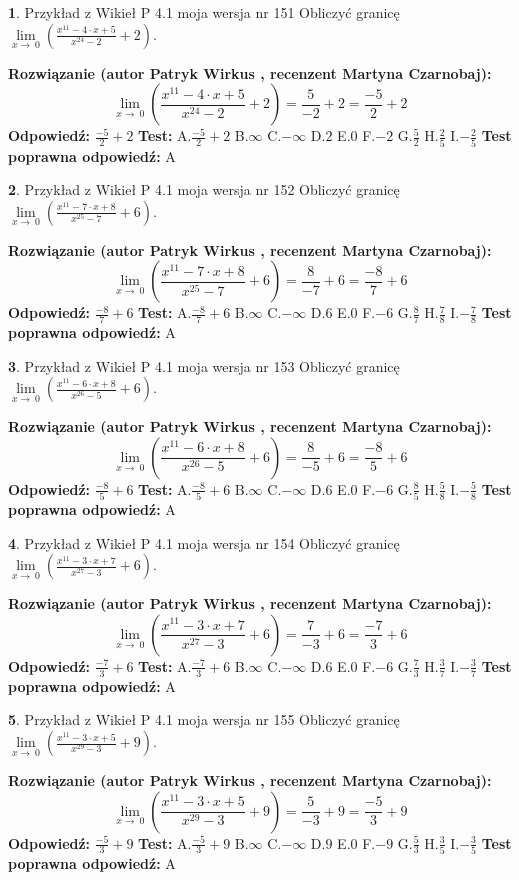 \documentclass[12pt, a4paper]{article}
\theoremstyle{definition} %
\newtheorem{zad}{}
\newcommand{\zadStart}[1]{\begin{zad}#1\newline}
\newcommand{\zadStop}{\end{zad}}
\newcommand{\rozwStart}[2]{\noindent \textbf{Rozwiązanie (autor #1 , recenzent #2): }\newline}
\newcommand{\rozwStop}{\newline}
\newcommand{\odpStart}{\noindent \textbf{Odpowiedź:}\newline}
\newcommand{\odpStop}{\newline}
\newcommand{\testStart}{\noindent \textbf{Test:}\newline}
\newcommand{\testStop}{\newline}
\newcommand{\kluczStart}{\noindent \textbf{Test poprawna odpowiedź:}\newline}
\newcommand{\kluczStop}{\newline}
\begin{document}
\zadStart{Przykład z Wikieł P 4.1 moja wersja nr 151}
Obliczyć granicę $\lim\limits_{x\to\ 0}(\frac{x^{11}-4 \cdot x +5}{x^{24}-2}+2)$.
\zadStop
\rozwStart{Patryk Wirkus}{Martyna Czarnobaj}
$$\lim\limits_{x\to\ 0}(\frac{x^{11}-4 \cdot x +5}{x^{24}-2}+2)=\frac{5}{-2}+2=\frac{-5}{2}+2$$
\rozwStop
\odpStart
$\frac{-5}{2}+2$
\odpStop
\testStart
A.$\frac{-5}{2}+2$
B.$\infty$
C.$-\infty$
D.$2$
E.$0$
F.$-2$
G.$\frac{5}{2}$
H.$\frac{2}{5}$
I.$-\frac{2}{5}$
\testStop
\kluczStart
A
\kluczStop



\zadStart{Przykład z Wikieł P 4.1 moja wersja nr 152}
Obliczyć granicę $\lim\limits_{x\to\ 0}(\frac{x^{11}-7 \cdot x +8}{x^{25}-7}+6)$.
\zadStop
\rozwStart{Patryk Wirkus}{Martyna Czarnobaj}
$$\lim\limits_{x\to\ 0}(\frac{x^{11}-7 \cdot x +8}{x^{25}-7}+6)=\frac{8}{-7}+6=\frac{-8}{7}+6$$
\rozwStop
\odpStart
$\frac{-8}{7}+6$
\odpStop
\testStart
A.$\frac{-8}{7}+6$
B.$\infty$
C.$-\infty$
D.$6$
E.$0$
F.$-6$
G.$\frac{8}{7}$
H.$\frac{7}{8}$
I.$-\frac{7}{8}$
\testStop
\kluczStart
A
\kluczStop



\zadStart{Przykład z Wikieł P 4.1 moja wersja nr 153}
Obliczyć granicę $\lim\limits_{x\to\ 0}(\frac{x^{11}-6 \cdot x +8}{x^{26}-5}+6)$.
\zadStop
\rozwStart{Patryk Wirkus}{Martyna Czarnobaj}
$$\lim\limits_{x\to\ 0}(\frac{x^{11}-6 \cdot x +8}{x^{26}-5}+6)=\frac{8}{-5}+6=\frac{-8}{5}+6$$
\rozwStop
\odpStart
$\frac{-8}{5}+6$
\odpStop
\testStart
A.$\frac{-8}{5}+6$
B.$\infty$
C.$-\infty$
D.$6$
E.$0$
F.$-6$
G.$\frac{8}{5}$
H.$\frac{5}{8}$
I.$-\frac{5}{8}$
\testStop
\kluczStart
A
\kluczStop



\zadStart{Przykład z Wikieł P 4.1 moja wersja nr 154}
Obliczyć granicę $\lim\limits_{x\to\ 0}(\frac{x^{11}-3 \cdot x +7}{x^{27}-3}+6)$.
\zadStop
\rozwStart{Patryk Wirkus}{Martyna Czarnobaj}
$$\lim\limits_{x\to\ 0}(\frac{x^{11}-3 \cdot x +7}{x^{27}-3}+6)=\frac{7}{-3}+6=\frac{-7}{3}+6$$
\rozwStop
\odpStart
$\frac{-7}{3}+6$
\odpStop
\testStart
A.$\frac{-7}{3}+6$
B.$\infty$
C.$-\infty$
D.$6$
E.$0$
F.$-6$
G.$\frac{7}{3}$
H.$\frac{3}{7}$
I.$-\frac{3}{7}$
\testStop
\kluczStart
A
\kluczStop



\zadStart{Przykład z Wikieł P 4.1 moja wersja nr 155}
Obliczyć granicę $\lim\limits_{x\to\ 0}(\frac{x^{11}-3 \cdot x +5}{x^{29}-3}+9)$.
\zadStop
\rozwStart{Patryk Wirkus}{Martyna Czarnobaj}
$$\lim\limits_{x\to\ 0}(\frac{x^{11}-3 \cdot x +5}{x^{29}-3}+9)=\frac{5}{-3}+9=\frac{-5}{3}+9$$
\rozwStop
\odpStart
$\frac{-5}{3}+9$
\odpStop
\testStart
A.$\frac{-5}{3}+9$
B.$\infty$
C.$-\infty$
D.$9$
E.$0$
F.$-9$
G.$\frac{5}{3}$
H.$\frac{3}{5}$
I.$-\frac{3}{5}$
\testStop
\kluczStart
A
\kluczStop
\end{document}
